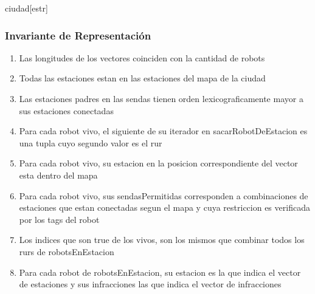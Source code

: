   \begin{Estructura}{ciudad}[estr]
    \begin{Tupla}[estr]
    \end{Tupla}

  \end{Estructura}

\subsubsection{Invariante de Representaci\'on}

\renewcommand{\labelenumi}{(\Roman{enumi})}

\begin{enumerate}
\item Las longitudes de los vectores coinciden con la cantidad de robots
\item Todas las estaciones estan en las estaciones del mapa de la ciudad
\item Las estaciones padres en las sendas tienen orden lexicograficamente mayor a sus estaciones conectadas
\item Para cada robot vivo, el siguiente de su iterador en sacarRobotDeEstacion es una tupla cuyo segundo valor es el rur
\item Para cada robot vivo, su estacion en la posicion correspondiente del vector esta dentro del mapa
\item Para cada robot vivo, sus sendasPermitidas corresponden a combinaciones de estaciones que estan conectadas segun el mapa
y cuya restriccion es verificada por los tags del robot
\item Los indices que son true de los vivos, son los mismos que combinar todos los rurs de robotsEnEstacion
\item Para cada robot de robotsEnEstacion, su estacion es la que indica el vector de estaciones y sus infracciones las que indica el vector de infracciones
\end{enumerate}

